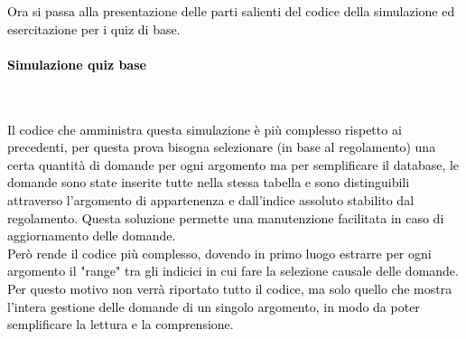 \textcolor{black}{Ora si passa alla presentazione delle parti salienti del codice della simulazione ed esercitazione per i quiz di base.}\\

\paragraph{\textcolor{black}{Simulazione quiz base}}\leavevmode\\

\raggedright
\textcolor{black}{Il codice che amministra questa simulazione è più complesso rispetto ai precedenti, per questa prova bisogna selezionare (in base al regolamento) una certa quantità di domande per ogni argomento ma per semplificare il database, le domande sono state inserite tutte nella stessa tabella e sono distinguibili attraverso l'argomento di appartenenza e dall'indice assoluto stabilito dal regolamento. Questa soluzione permette una manutenzione facilitata in caso di aggiornamento delle domande.\\
Però rende il codice più complesso, dovendo in primo luogo estrarre per ogni argomento il "range" tra gli indicici in cui fare la selezione causale delle domande.\\
Per questo motivo non verrà riportato tutto il codice, ma solo quello che mostra l'intera gestione delle domande di un singolo argomento, in modo da poter semplificare la lettura e la comprensione.}\\

